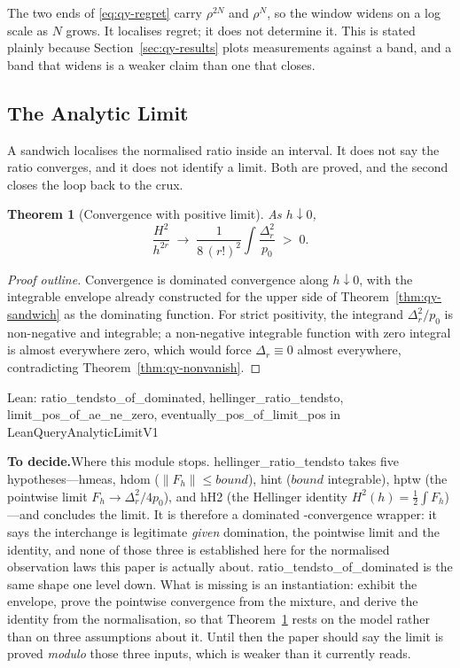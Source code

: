 \documentclass[conference]{IEEEtran}
\newtheorem{theorem}{Theorem}
\theoremstyle{definition}
\newcommand{\lean}[1]{\textsf{\footnotesize #1}}
\newcommand{\leanbox}[1]{%
  \par\vspace{2pt}\noindent
  {\footnotesize\textsf{Lean: #1}}\par\vspace{2pt}}
\newif\ifshownotes\shownotestrue
\newcommand{\TODOPAR}[1]{\ifshownotes\par\vspace{2pt}\noindent%
  {\color{todocol}\textsf{\footnotesize\textbf{To decide.}\;#1}}\par\vspace{2pt}\fi}
\begin{document}
The two ends of \eqref{eq:qy-regret} carry $\rho^{2N}$ and $\rho^{N}$, so the window widens on a
log scale as $N$ grows. It localises regret; it does not determine it. This is stated plainly
because Section~\ref{sec:qy-results} plots measurements against a band, and a band that widens
is a weaker claim than one that closes.

\subsection{The Analytic Limit}
\label{sec:qy-limit}

A sandwich localises the normalised ratio inside an interval. It does not say the ratio
converges, and it does not identify a limit. Both are proved, and the second closes the loop
back to the crux.

\begin{theorem}[Convergence with positive limit]
\label{thm:qy-limit}
As $h\downarrow0$,
\begin{equation}
\frac{H^{2}}{h^{2r}}\;\longrightarrow\;\frac{1}{8\,(r!)^{2}}\int\frac{\Delta_{r}^{2}}{p_{0}}
\;>\;0 .
\label{eq:qy-limit}
\end{equation}
\end{theorem}

\begin{proof}[Proof outline]
Convergence is dominated convergence along $h\downarrow0$, with the integrable envelope
already constructed for the upper side of Theorem~\ref{thm:qy-sandwich} as the dominating
function. For strict positivity, the integrand $\Delta_{r}^{2}/p_{0}$ is non-negative and
integrable; a non-negative integrable function with zero integral is almost everywhere zero,
which would force $\Delta_{r}\equiv0$ almost everywhere, contradicting
Theorem~\ref{thm:qy-nonvanish}.
\end{proof}

\leanbox{\lean{ratio\_tendsto\_of\_dominated}, \lean{hellinger\_ratio\_tendsto},
\lean{limit\_pos\_of\_ae\_ne\_zero}, \lean{eventually\_pos\_of\_limit\_pos} in
\lean{LeanQueryAnalyticLimitV1}}
\TODOPAR{Where this module stops. \lean{hellinger\_ratio\_tendsto} takes five
hypotheses---\lean{hmeas}, \lean{hdom} ($\lVert F_{h}\rVert\le\mathit{bound}$), \lean{hint}
($\mathit{bound}$ integrable), \lean{hptw} (the pointwise limit
$F_{h}\to\Delta_{r}^{2}/4p_{0}$), and \lean{hH2} (the Hellinger identity
$H^{2}(h)=\tfrac12\int F_{h}$)---and concludes the limit. It is therefore a dominated
-convergence wrapper: it says the interchange is legitimate \emph{given} domination, the
pointwise limit and the identity, and none of those three is established here for the
normalised observation laws this paper is actually about. \lean{ratio\_tendsto\_of\_dominated}
is the same shape one level down. What is missing is an instantiation: exhibit the envelope,
prove the pointwise convergence from the mixture, and derive the identity from the
normalisation, so that Theorem~\ref{thm:qy-limit} rests on the model rather than on three
assumptions about it. Until then the paper should say the limit is proved \emph{modulo} those
three inputs, which is weaker than it currently reads.}
\end{document}
